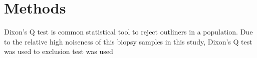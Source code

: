\chapter{Methods}

Dixon's Q test is common statistical tool to reject outliners in a population. Due to the relative high noiseness of this biopsy samples in this study, Dixon's Q test was used to  exclusion test was used 